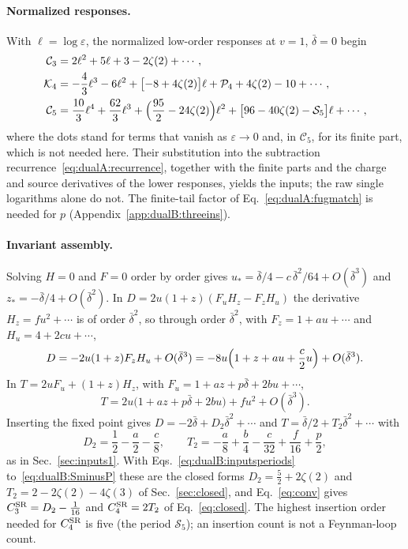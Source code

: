 \documentclass[11pt,a4paper]{article}
\numberwithin{equation}{section}
\newcommand{\CSR}{C^{\rm SR}}
\newcommand{\db}{\bar\delta}
\begin{document}
\paragraph{Normalized responses.} With $\ell=\log\varepsilon$, the normalized low-order responses at $v=1$, $\db=0$
begin
\begin{align}
 \mathcal C_3&=2\ell^2+5\ell+3-2\zeta(2)+\cdots,\label{eq:dualB:C3}\\
 \mathcal K_4&=-\frac43\ell^3-6\ell^2+\bigl[-8+4\zeta(2)\bigr]\ell+\mathcal P_4+4\zeta(2)-10+\cdots,\label{eq:dualB:K4}\\
 \mathcal C_5&=\frac{10}{3}\ell^4+\frac{62}{3}\ell^3+\Bigl(\frac{95}{2}-24\zeta(2)\Bigr)\ell^2
 +\bigl[96-40\zeta(2)-\mathcal S_5\bigr]\ell+\cdots,\label{eq:dualB:C5}
\end{align}
where the dots stand for terms that vanish as $\varepsilon\to0$ and, in $\mathcal C_5$, for its finite part, which is
not needed here. Their substitution into the subtraction recurrence~\eqref{eq:dualA:recurrence}, together with the
finite parts and the charge and source derivatives of the lower responses, yields the inputs; the raw single
logarithms alone do not. The finite-tail factor of Eq.~\eqref{eq:dualA:fugmatch} is needed for $p$
(Appendix~\ref{app:dualB:threeins}).

\paragraph{Invariant assembly.} Solving $H=0$ and $F=0$ order by order gives $u_*=\db/4-c\,\db^2/64+O(\db^3)$ and
$z_*=-\db/4+O(\db^2)$. In $D=2u(1+z)(F_uH_z-F_zH_u)$ the derivative $H_z=fu^2+\cdots$ is of order $\db^2$, so through
order $\db^2$, with $F_z=1+au+\cdots$ and $H_u=4+2cu+\cdots$,
\begin{equation}
 D=-2u(1+z)F_zH_u+O(\db^3)=-8u\Bigl(1+z+au+\frac c2u\Bigr)+O(\db^3).
\end{equation}
In $T=2uF_u+(1+z)H_z$, with $F_u=1+az+p\db+2bu+\cdots$,
\begin{equation}
 T=2u\bigl(1+az+p\db+2bu\bigr)+fu^2+O(\db^3).
\end{equation}
Inserting the fixed point gives $D=-2\db+D_2\db^2+\cdots$ and $T=\db/2+T_2\db^2+\cdots$ with
\begin{equation}
 D_2=\frac12-\frac a2-\frac c8,\qquad T_2=-\frac a8+\frac b4-\frac c{32}+\frac f{16}+\frac p2,
\end{equation}
as in Sec.~\ref{sec:inputs1}. With Eqs.~\eqref{eq:dualB:inputsperiods} to~\eqref{eq:dualB:SminusP} these are the
closed forms $D_2=\frac52+2\zeta(2)$ and $T_2=2-2\zeta(2)-4\zeta(3)$ of Sec.~\ref{sec:closed}, and Eq.~\eqref{eq:conv}
gives $\CSR_3=D_2-\frac1{16}$ and $\CSR_4=2T_2$ of Eq.~\eqref{eq:closed}. The highest insertion order needed for
$\CSR_4$ is five (the period $\mathcal S_5$); an insertion count is not a Feynman-loop count.
\end{document}
